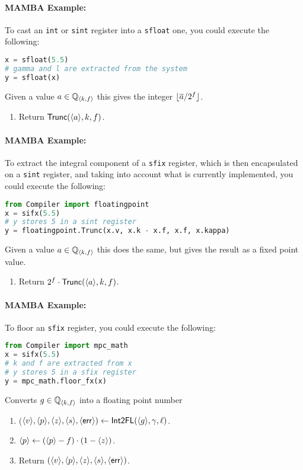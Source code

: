 \paragraph{MAMBA Example:} To cast an \verb|int| or \verb|sint| register into a \verb|sfloat| one, you could execute the following: 
\begin{lstlisting}[language={python}]
x = sfloat(5.5)
# gamma and l are extracted from the system
y = sfloat(x)
\end{lstlisting}


Given a value $a \in {\mathbb{Q}}_{\langle k, f \rangle}$ this gives the integer
${\lfloor \overline{a}/2^f \rfloor}$.
\begin{enumerate}
\item Return $\mathsf{Trunc}(\langle a \rangle,k,f)$.
\end{enumerate}

\paragraph{MAMBA Example:} To extract the integral component of a \verb|sfix| register, which is then encapsulated on a \verb|sint| register, 
and taking into account what is currently implemented, you could execute the following: 
\begin{lstlisting}[language={python}]
from Compiler import floatingpoint
x = sifx(5.5)
# y stores 5 in a sint register
y = floatingpoint.Trunc(x.v, x.k - x.f, x.f, x.kappa)
\end{lstlisting}
Given a value $a \in {\mathbb{Q}}_{\langle k, f \rangle}$ this does the same, but
gives the result as a fixed point value.
\begin{enumerate}
\item Return $2^f \cdot \mathsf{Trunc}(\langle a \rangle,k,f)$.
\end{enumerate}
\paragraph{MAMBA Example:} To floor an \verb|sfix| register, you could execute the following: 
\begin{lstlisting}[language={python}]
from Compiler import mpc_math
x = sifx(5.5)
# k and f are extracted from x
# y stores 5 in a sfix register
y = mpc_math.floor_fx(x)
\end{lstlisting}

Converts $g \in {\mathbb{Q}}_{\langle k, f \rangle}$ into a floating point number
\begin{enumerate}
\item ($\langle v \rangle,\langle p \rangle,\langle z \rangle,\langle s \rangle,\langle \mathsf{err} \rangle)
	\leftarrow \mathsf{Int2FL}(\langle g \rangle,\gamma,\ell)$.
\item $\langle p \rangle \leftarrow (\langle p \rangle-f) \cdot (1-\langle z \rangle)$.
\item Return $(\langle v \rangle,\langle p \rangle,\langle z \rangle,\langle s \rangle,\langle \mathsf{err} \rangle)$.
\end{enumerate}
